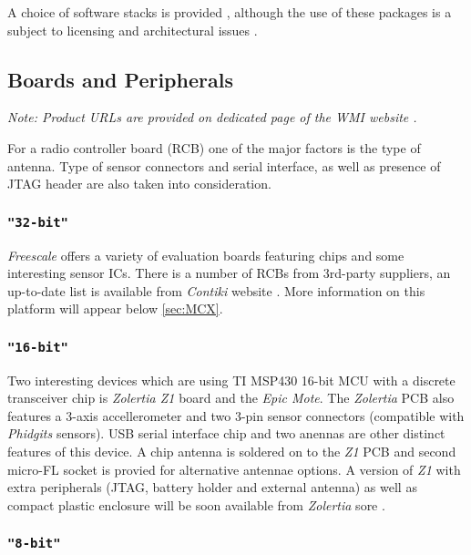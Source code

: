  A choice of software stacks is provided \cite{atmel:avr2070,
 atmel:avr2025, atmel:avr2102, atmel:zbpro}, although the use
 of these packages is a subject to licensing and architectural
 issues \cite{wmi:wiki:atmelsw}.

\subsection{Boards and Peripherals}

 \emph{Note: Product URLs are provided on dedicated page of the WMI
 website \cite{wmi:wiki:devhw}.}
 \newline

 For a radio controller board (RCB) one of the major factors is the
 type of antenna. Type of sensor connectors and serial interface,
 as well as presence of JTAG header are also taken into consideration.

\subsubsection{\texttt{"32-bit"}}

 \emph{Freescale} offers a variety of evaluation boards featuring
  chips and some interesting sensor ICs. There is
 a number of  RCBs from 3rd-party suppliers, an
 up-to-date list is available from \emph{Contiki} 
 website \cite{links:contiki:rcb:mc1322x}. More information on
 this platform will appear below \ref{sec:MCX}.

\subsubsection{\texttt{"16-bit"}}

 Two interesting devices which are using TI MSP430 16-bit MCU with
 a discrete transceiver chip is \emph{Zolertia Z1} board and the
 \emph{Epic Mote}. The \emph{Zolertia} PCB also features a 3-axis
 accellerometer and two 3-pin sensor connectors (compatible with
 \emph{Phidgits} sensors). USB serial interface chip and two anennas
 are other distinct features of this device. A chip antenna is
 soldered on to the \emph{Z1} PCB and second micro-FL socket is
 provied for alternative antennae options. A version of \emph{Z1}
 with extra peripherals (JTAG, battery holder and external antenna)
 as well as compact plastic enclosure will be soon available
 from \emph{Zolertia} sore \cite{links:zolertia:store}.
 
\subsubsection{\texttt{"8-bit"}}


